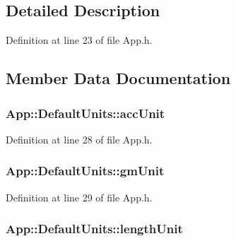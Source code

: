 \subsection{Detailed Description}


Definition at line 23 of file App.\+h.



\subsection{Member Data Documentation}
\hypertarget{struct_app_1_1_default_units_a7803c87c80c03066c6d4737781edc50d}{
\subsubsection[{acc\+Unit}]{ App\+::\+Default\+Units\+::acc\+Unit}}\label{struct_app_1_1_default_units_a7803c87c80c03066c6d4737781edc50d}


Definition at line 28 of file App.\+h.

\hypertarget{struct_app_1_1_default_units_a134222849fbe7070dc8a2471b8d2afb5}{
\subsubsection[{gm\+Unit}]{ App\+::\+Default\+Units\+::gm\+Unit}}\label{struct_app_1_1_default_units_a134222849fbe7070dc8a2471b8d2afb5}


Definition at line 29 of file App.\+h.

\hypertarget{struct_app_1_1_default_units_ad54dce1ee4af8f666579130f55034506}{
\subsubsection[{length\+Unit}]{ App\+::\+Default\+Units\+::length\+Unit}}\label{struct_app_1_1_default_units_ad54dce1ee4af8f666579130f55034506}


